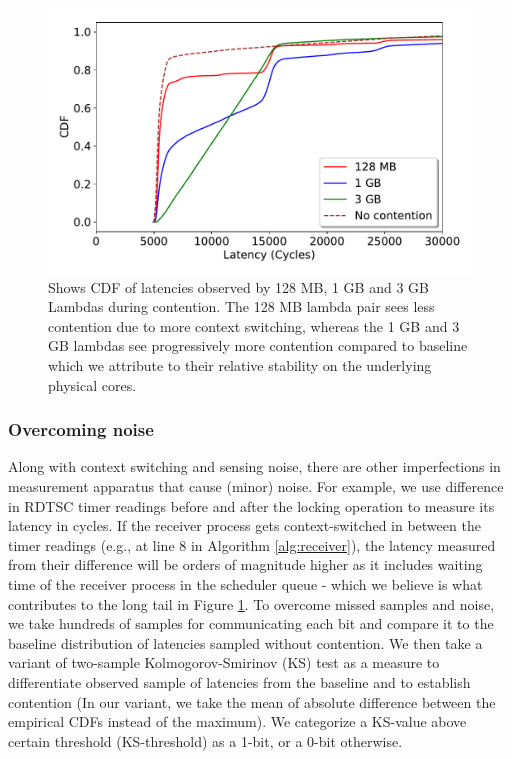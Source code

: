 \begin{figure}[!t]
  \includegraphics[width=.99\linewidth]{fig/lambda_sched_effect.pdf}
  \caption{Shows CDF of latencies observed by 128 MB, 1 GB and 3 GB Lambdas during 
  contention. The 128 MB lambda pair sees less contention due to more context switching, 
  whereas the 1 GB and 3 GB lambdas see progressively more contention compared to baseline 
  which we attribute to their relative stability on the underlying physical cores. 
\label{fig:context_switching}}
\end{figure}

\subsubsection{Overcoming noise} 
\label{sec:method:noise}
Along with context switching and sensing noise, there are other imperfections 
in measurement apparatus that cause (minor) noise. For example, we use difference
in RDTSC timer readings before and after the locking operation to measure its 
latency in cycles. If the receiver process gets context-switched in 
between the timer readings 
(e.g., at line 8 in Algorithm \ref{alg:receiver}), the latency measured from 
their difference will be orders of magnitude higher 
as it includes waiting time of the receiver process in the scheduler queue 
- which we believe is what contributes 
to the long tail in Figure \ref{fig:context_switching}. To overcome missed 
samples and noise, we take hundreds of samples for communicating each bit 
and compare it to the baseline 
distribution of latencies sampled without contention. 
We then take a variant of two-sample Kolmogorov-Smirinov (KS) test as a measure 
to differentiate observed sample of latencies from the baseline and to establish 
contention (In our variant, we take the mean of absolute difference between the 
empirical CDFs instead of the maximum). We categorize a KS-value above certain 
threshold (KS-threshold) as a 1-bit, or a 0-bit otherwise. 

